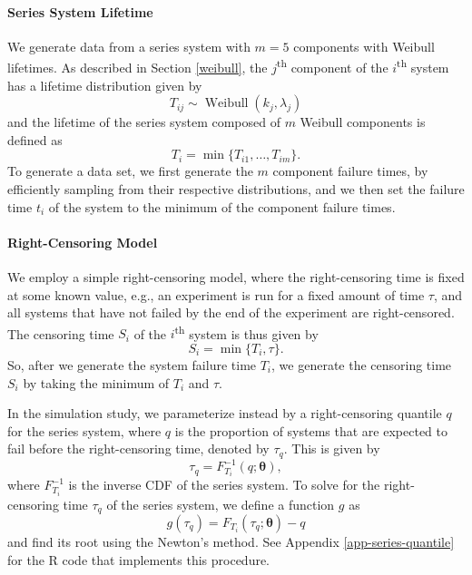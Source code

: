 \documentclass[
]{article}
\theoremstyle{definition}
\theoremstyle{plain}
\theoremstyle{definition}
\theoremstyle{definition}
\theoremstyle{definition}
\theoremstyle{definition}
\theoremstyle{remark}
\begin{document}
\hypertarget{series-system-lifetime}{%
\paragraph*{Series System Lifetime}\label{series-system-lifetime}}

We generate data from a series system with \(m = 5\) components with Weibull
lifetimes. As described in Section \ref{weibull}, the \(j\)\textsuperscript{th}
component of the \(i\)\textsuperscript{th} system has a lifetime distribution
given by
\[
    T_{i j} \sim \operatorname{Weibull}(k_j, \lambda_j)
\]
and the lifetime of the series system composed of \(m\) Weibull components
is defined as
\[
    T_i = \min\{T_{i 1}, \ldots, T_{i m}\}.
\]
To generate a data set, we first generate the \(m\) component failure times,
by efficiently sampling from their respective distributions, and we then set
the failure time \(t_i\) of the system to the minimum of the component failure times.

\hypertarget{right-censoring-model}{%
\paragraph*{Right-Censoring Model}\label{right-censoring-model}}

We employ a simple right-censoring model, where the right-censoring time
is fixed at some known value, e.g., an experiment is run for a fixed
amount of time \(\tau\), and all systems that have not failed by the end of the
experiment are right-censored. The censoring time \(S_i\) of the
\(i\)\textsuperscript{th} system is thus given by
\[
    S_i = \min\{T_i, \tau\}.
\]
So, after we generate the system failure time \(T_i\), we generate the censoring
time \(S_i\) by taking the minimum of \(T_i\) and \(\tau\).

In the simulation study, we parameterize instead by a right-censoring quantile
\(q\) for the series system, where \(q\) is the proportion of systems that are
expected to fail before the right-censoring time, denoted by \(\tau_q\). This is
given by
\[
    \tau_q = F_{T_i}^{-1}(q;\boldsymbol{\theta}),
\]
where \(F_{T_i}^{-1}\) is the inverse CDF of the series system. To solve for the
right-censoring time \(\tau_q\) of the series system, we define a function \(g\) as
\[
g(\tau_q) = F_{T_i}(\tau_q;\boldsymbol{\theta}) - q
\]
and find its root using the Newton's method. See Appendix
\ref{app-series-quantile} for the R code that implements this procedure.
\end{document}
